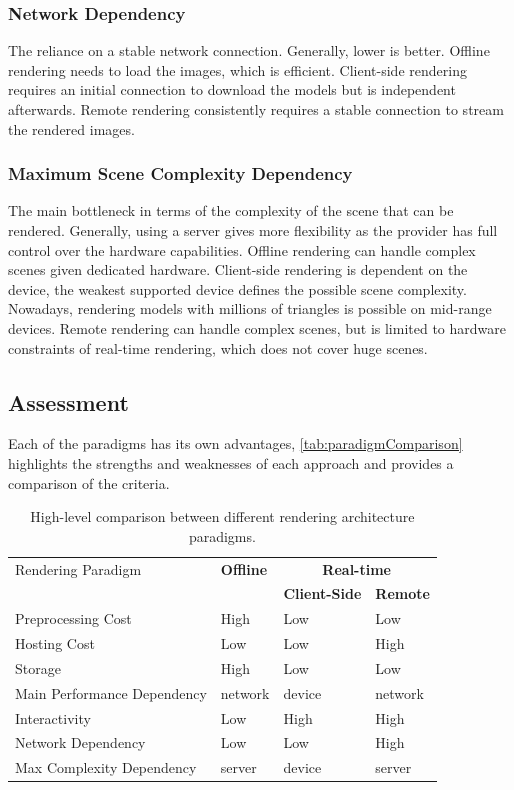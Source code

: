 \subsubsection{Network Dependency}

The reliance on a stable network connection. Generally, lower is better. Offline rendering needs to load the images, which is efficient. Client-side rendering requires an initial connection to download the models but is independent afterwards. Remote rendering consistently requires a stable connection to stream the rendered images.

\subsubsection{Maximum Scene Complexity Dependency}

The main bottleneck in terms of the complexity of the scene that can be rendered. Generally, using a server gives more flexibility as the provider has full control over the hardware capabilities. Offline rendering can handle complex scenes given dedicated hardware. Client-side rendering is dependent on the device, the weakest supported device defines the possible scene complexity. Nowadays, rendering models with millions of triangles is possible on mid-range devices. Remote rendering can handle complex scenes, but is limited to hardware constraints of real-time rendering, which does not cover huge scenes.

\subsection*{Assessment}
\label{ch:paradigmAssessment}

Each of the paradigms has its own advantages, \autoref{tab:paradigmComparison} highlights the strengths and weaknesses of each approach and provides a comparison of the criteria.

\begin{table}[H]
  \centering
  \begin{tabular}{@{}p{5cm}p{2.5cm}p{2.5cm}p{2.5cm}@{}}
  \toprule
  Rendering Paradigm & \textbf{Offline} & \multicolumn{2}{c}{\textbf{Real-time}} \\
   &  & \textbf{Client-Side} & \textbf{Remote} \\
  Preprocessing Cost & High & Low & Low \\
  Hosting Cost & Low & Low & High \\
  Storage & High & Low & Low \\
  Main Performance \newline Dependency & network & device & network \\
  Interactivity & Low & High & High \\
  Network Dependency & Low & Low & High \\
  Max Complexity Dependency & server & device & server \\
  \bottomrule
  \end{tabular}
  \caption{High-level comparison between different rendering architecture paradigms.}
  \label{tab:paradigmComparison}
\end{table}

